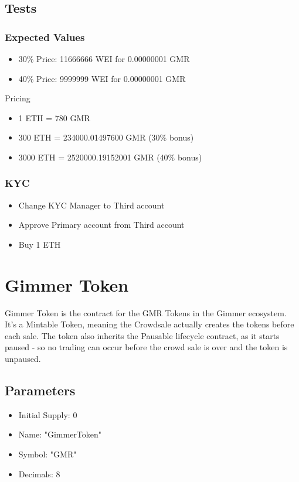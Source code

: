 \documentclass[11pt]{article} %
\begin{document}
\subsection{Tests}

\subsubsection{Expected Values}

\begin{itemize}
    \item 30\% Price: 11666666 WEI for 0.00000001 GMR
    \item 40\% Price:  9999999 WEI for 0.00000001 GMR
\end{itemize}

Pricing
\begin{itemize}
    \item 1 ETH = 780 GMR
    \item 300 ETH = 234000.01497600 GMR (30\% bonus)
    \item 3000 ETH = 2520000.19152001 GMR (40\% bonus)
\end{itemize}


\subsubsection{KYC}
\begin{itemize}
    \item Change KYC Manager to Third account
    \item Approve Primary account from Third account
    \item Buy 1 ETH
\end{itemize}


\section{Gimmer Token}

Gimmer Token is the contract for the GMR Tokens in the Gimmer ecosystem.
It's a Mintable Token, meaning the Crowdsale actually creates the tokens before each sale.
The token also inherits the Pausable lifecycle contract, as it starts paused - so no trading can occur before the crowd sale is over and the token is unpaused.

\subsection{Parameters}

\begin{itemize}
\item Initial Supply: 0
\item Name: "GimmerToken"
\item Symbol: "GMR"
\item Decimals: 8
\end{itemize}
\end{document}
